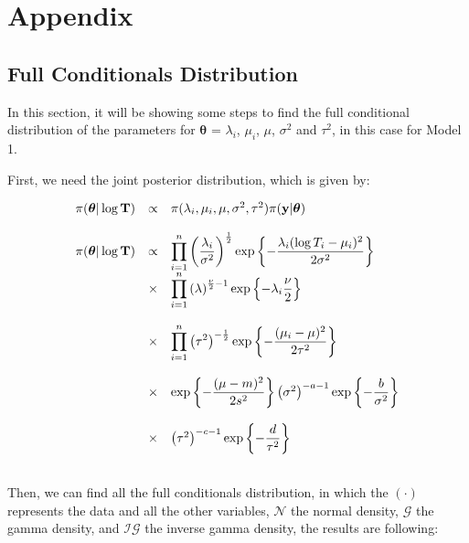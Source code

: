 \documentclass{asaproc}
\begin{document}
\section{Appendix}


\subsection{Full Conditionals Distribution}

In this section, it will be showing some steps to find the full conditional distribution of the parameters for $\boldsymbol{\theta}$ = $\lambda_i$, $\mu_i$, $\mu$, $\sigma^2$ and $\tau^2$, in this case for Model 1.

First, we need the joint posterior distribution, which is given by:
\begin{small}
\begin{eqnarray*}
\begin{array}{lcl ll }
\pi(\boldsymbol{\theta}|\log\textbf{T}) & \propto & \pi(\lambda_i, \mu_i, \mu, \sigma^2, \tau^2)\pi(\textbf{y}|\boldsymbol{\theta}) \\ \\

\pi(\boldsymbol{\theta}|\log\textbf{T}) & \propto &\displaystyle\prod_{i=1}^{n}  \left(\dfrac{\lambda_i}{\sigma^2}\right)^{\frac{1}{2}}\mbox{exp}\left\{ -\dfrac{ \lambda_i(\log T_i - \mu_i)^2}{2\sigma^2} \right\} \\
& \times & \displaystyle\prod_{i=1}^{n} \left(\lambda\right)^{\frac{\nu}{2}-1}\mbox{exp}\left\{ -\lambda_i \dfrac{\nu}{2}\right\} \\ \\
& \times & \displaystyle\prod_{i=1}^{n} \left(\tau^2\right)^{-\frac{1}{2}}\mbox{exp}\left\{ -\dfrac{(\mu_i - \mu)^2}{2\tau^2}\right\}  \\ \\
& \times &\mbox{exp}\left\{ -\dfrac{(\mu - m)^2}{2s^2}\right\} \left(\sigma^2\right)^{-a-1} \mbox{exp}\left\{ -\dfrac{b}{\sigma^2}\right\}  \\ \\
& \times &  \left(\tau^2\right)^{-c-1} \mbox{exp}\left\{ -\dfrac{d}{\tau^2}\right\}  \\ \\
\end{array}
\end{eqnarray*}
\end{small}

Then, we can find all the full conditionals distribution, in which the $(\cdot)$ represents the data and all the other variables, $\mathcal{N}$ the normal density, $\mathcal{G}$ the gamma density, and $\mathcal{IG}$ the inverse gamma density, the results are following:
\end{document}
